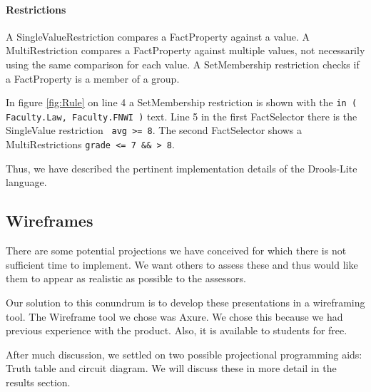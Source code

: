 \paragraph{Restrictions} A SingleValueRestriction compares a FactProperty against a value.
A MultiRestriction compares a FactProperty against multiple values, not necessarily using the same comparison for each value.
A SetMembership restriction checks if a FactProperty is a member of a group.

In figure \ref{fig:Rule} on line 4 a SetMembership restriction is shown with the \texttt{in ( Faculty.Law, Faculty.FNWI )} text.
Line 5 in the first FactSelector there is the SingleValue restriction \texttt{ avg >= 8}.
The second FactSelector shows a MultiRestrictions \texttt{grade <= 7 \&\& > 8}.

Thus, we have described the pertinent implementation details of the Drools-Lite language.

\subsection{Wireframes}

There are some potential projections we have conceived for which there is not sufficient time to implement.
We want others to assess these and thus would like them to appear as realistic as possible to the assessors.

Our solution to this conundrum is to develop these presentations in a wireframing tool.
The Wireframe tool we chose was Axure\cite{Axure_ProductPage}.
We chose this because we had previous experience with the product.
Also, it is available to students for free.

After much discussion, we settled on two possible projectional programming aids: Truth table and circuit diagram.
We will discuss these in more detail in the results section.
